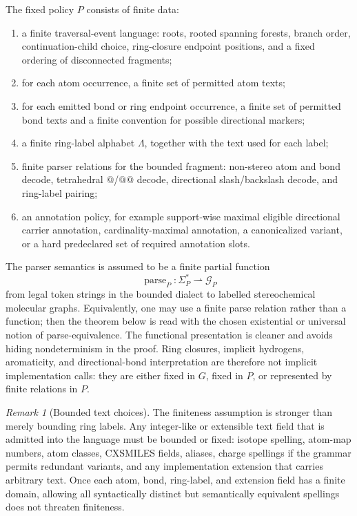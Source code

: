 \documentclass[10pt,a4paper]{article}
\newcommand{\parse}{\operatorname{parse}}
\theoremstyle{definition}
\theoremstyle{remark}
\newtheorem{remark}[lemma]{Remark}
\begin{document}
	The fixed policy \(P\) consists of finite data:
	\begin{enumerate}[label=\textup{(P\arabic*)},leftmargin=2.5em]
		\item a finite traversal-event language: roots, rooted spanning forests, branch
		order, continuation-child choice, ring-closure endpoint positions, and a fixed
		ordering of disconnected fragments;
		\item for each atom occurrence, a finite set of permitted atom texts;
		\item for each emitted bond or ring endpoint occurrence, a finite set of
		permitted bond texts and a finite convention for possible directional markers;
		\item a finite ring-label alphabet \(\Lambda\), together with the text used for
		each label;
		\item finite parser relations for the bounded fragment: non-stereo atom and bond
		decode, tetrahedral \(@\)/\(@@\) decode, directional slash/backslash decode, and
		ring-label pairing;
		\item an annotation policy, for example support-wise maximal eligible
		directional carrier annotation, cardinality-maximal annotation, a canonicalized
		variant, or a hard predeclared set of required annotation slots.
	\end{enumerate}

	The parser semantics is assumed to be a finite partial function
	\[
	\parse_P:\Sigma_P^*\rightharpoonup \mathcal G_P
	\]
	from legal token strings in the bounded dialect to labelled stereochemical
	molecular graphs.  Equivalently, one may use a finite parse relation rather than
	a function; then the theorem below is read with the chosen existential or
	universal notion of parse-equivalence.  The functional presentation is cleaner
	and avoids hiding nondeterminism in the proof.  Ring closures, implicit
	hydrogens, aromaticity, and directional-bond interpretation are therefore not
	implicit implementation calls: they are either fixed in \(G\), fixed in \(P\), or
	represented by finite relations in \(P\).

	\begin{remark}[Bounded text choices]
		The finiteness assumption is stronger than merely bounding ring labels.  Any
		integer-like or extensible text field that is admitted into the language must be
		bounded or fixed: isotope spelling, atom-map numbers, atom classes, CXSMILES
		fields, aliases, charge spellings if the grammar permits redundant variants,
		and any implementation extension that carries arbitrary text.  Once each atom,
		bond, ring-label, and extension field has a finite domain, allowing all
		syntactically distinct but semantically equivalent spellings does not threaten
		finiteness.
	\end{remark}
\end{document}
